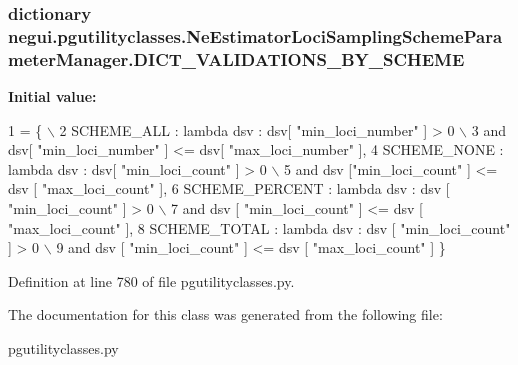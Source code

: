 \subsubsection[{\texorpdfstring{D\+I\+C\+T\+\_\+\+V\+A\+L\+I\+D\+A\+T\+I\+O\+N\+S\+\_\+\+B\+Y\+\_\+\+S\+C\+H\+E\+ME}{DICT_VALIDATIONS_BY_SCHEME}}]{\setlength{\rightskip}{0pt plus 5cm}dictionary negui.\+pgutilityclasses.\+Ne\+Estimator\+Loci\+Sampling\+Scheme\+Parameter\+Manager.\+D\+I\+C\+T\+\_\+\+V\+A\+L\+I\+D\+A\+T\+I\+O\+N\+S\+\_\+\+B\+Y\+\_\+\+S\+C\+H\+E\+ME\hspace{0.3cm}{\ttfamily [static]}}\hypertarget{classnegui_1_1pgutilityclasses_1_1NeEstimatorLociSamplingSchemeParameterManager_a3ad95921c5156b33d8951460b5475aee}{}\label{classnegui_1_1pgutilityclasses_1_1NeEstimatorLociSamplingSchemeParameterManager_a3ad95921c5156b33d8951460b5475aee}
{\bfseries Initial value\+:}
\begin{DoxyCode}
1 = \{ \(\backslash\)
2                     SCHEME\_ALL : \textcolor{keyword}{lambda} dsv : dsv[ \textcolor{stringliteral}{"min\_loci\_number"} ] > 0  \(\backslash\)
3                                         \textcolor{keywordflow}{and} dsv[ \textcolor{stringliteral}{"min\_loci\_number"} ] <= dsv[ \textcolor{stringliteral}{"max\_loci\_number"} ],
4                     SCHEME\_NONE : \textcolor{keyword}{lambda} dsv : dsv[ \textcolor{stringliteral}{"min\_loci\_count"} ] > 0 \(\backslash\)
5                                         \textcolor{keywordflow}{and} dsv [\textcolor{stringliteral}{"min\_loci\_count"} ] <= dsv [ \textcolor{stringliteral}{"max\_loci\_count"} ],
6                     SCHEME\_PERCENT : \textcolor{keyword}{lambda} dsv : dsv [ \textcolor{stringliteral}{"min\_loci\_count"} ] > 0 \(\backslash\)
7                                         \textcolor{keywordflow}{and} dsv [ \textcolor{stringliteral}{"min\_loci\_count"} ] <= dsv [ \textcolor{stringliteral}{"max\_loci\_count"} ],
8                     SCHEME\_TOTAL : \textcolor{keyword}{lambda} dsv : dsv [ \textcolor{stringliteral}{"min\_loci\_count"} ] > 0 \(\backslash\)
9                                         \textcolor{keywordflow}{and} dsv [ \textcolor{stringliteral}{"min\_loci\_count"} ] <= dsv [ \textcolor{stringliteral}{"max\_loci\_count"} ] \}
\end{DoxyCode}


Definition at line 780 of file pgutilityclasses.\+py.



The documentation for this class was generated from the following file\+:\begin{DoxyCompactItemize}
\item 
pgutilityclasses.\+py\end{DoxyCompactItemize}
